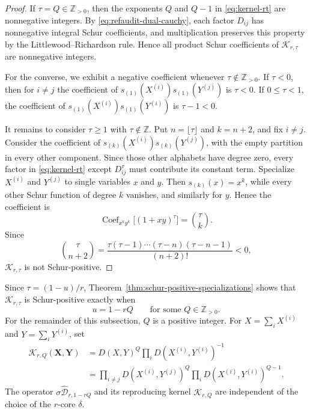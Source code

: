 \documentclass[12pt,reqno,a4paper]{amsart}
\numberwithin{equation}{section}
\numberwithin{figure}{section}
\theoremstyle{plain}
\theoremstyle{definition}
\DeclareMathOperator{\Coef}{Coef}
\begin{document}
\begin{proof}
If $\tau=Q\in\mathbb Z_{>0}$, then the exponents $Q$ and $Q-1$ in
\eqref{eq:kernel-rt} are nonnegative integers. By
\eqref{eq:refaudit-dual-cauchy}, each factor $D_{ij}$ has nonnegative
integral Schur coefficients, and multiplication preserves this
property by the Littlewood--Richardson rule. Hence all
product Schur coefficients of $\mathcal K_{r,\tau}$ are nonnegative
integers.

For the converse, we exhibit a negative coefficient whenever
$\tau\notin\mathbb Z_{>0}$.  If $\tau<0$, then for $i\neq j$ the coefficient of
$s_{(1)}(X^{(i)})s_{(1)}(Y^{(j)})$ is $\tau<0$.  If $0\leq \tau<1$, the
coefficient of $s_{(1)}(X^{(i)})s_{(1)}(Y^{(i)})$ is $\tau-1<0$.

It remains to consider $\tau\geq1$ with $\tau\notin\mathbb Z$.  Put
$n=\lfloor \tau\rfloor$ and $k=n+2$, and fix $i\neq j$.  Consider the
coefficient of $s_{(k)}(X^{(i)})s_{(k)}(Y^{(j)})$, with the empty
partition in every other component.  Since those other alphabets
have degree zero, every factor in \eqref{eq:kernel-rt} except
$D_{ij}^{\tau}$ must contribute its constant term.  Specialize
$X^{(i)}$ and $Y^{(j)}$ to single variables $x$ and $y$.
Then $s_{(k)}(x)=x^k$, while every other Schur function of degree
$k$ vanishes, and similarly for $y$.  Hence the coefficient is
\[
 \Coef_{x^ky^k}\bigl[(1+xy)^\tau\bigr]=\binom{\tau}{k}.
\]
Since
\[
 \binom{\tau}{n+2}
 =\frac{\tau(\tau-1)\cdots(\tau-n)(\tau-n-1)}{(n+2)!}<0,
\]
$\mathcal K_{r,\tau}$ is not Schur-positive.
\end{proof}

Since $\tau=(1-u)/r$, Theorem~\ref{thm:schur-positive-specializations}
shows that $\mathcal K_{r,\tau}$ is Schur-positive exactly when
\[
 u=1-rQ
 \qquad\text{for some }Q\in\mathbb Z_{>0}.
\]
For the remainder of this subsection, $Q$ is a positive integer.  For
$X=\sum_iX^{(i)}$ and $Y=\sum_iY^{(i)}$, set
\begin{equation}\label{eq:kernel-rq}
\begin{split}
 \mathcal K_{r,Q}(\mathbf X,\mathbf Y)
 &=D(X,Y)^Q\prod_iD(X^{(i)},Y^{(i)})^{-1}\\
 &=\prod_{i\neq j}D(X^{(i)},Y^{(j)})^Q
   \prod_iD(X^{(i)},Y^{(i)})^{Q-1}.
\end{split}
\end{equation}
The operator $\sigma\widehat{\mathcal D}_{r,1-rQ}$ and its reproducing
kernel $\mathcal K_{r,Q}$ are independent of the choice of the
$r$-core $\delta$.
\end{document}
